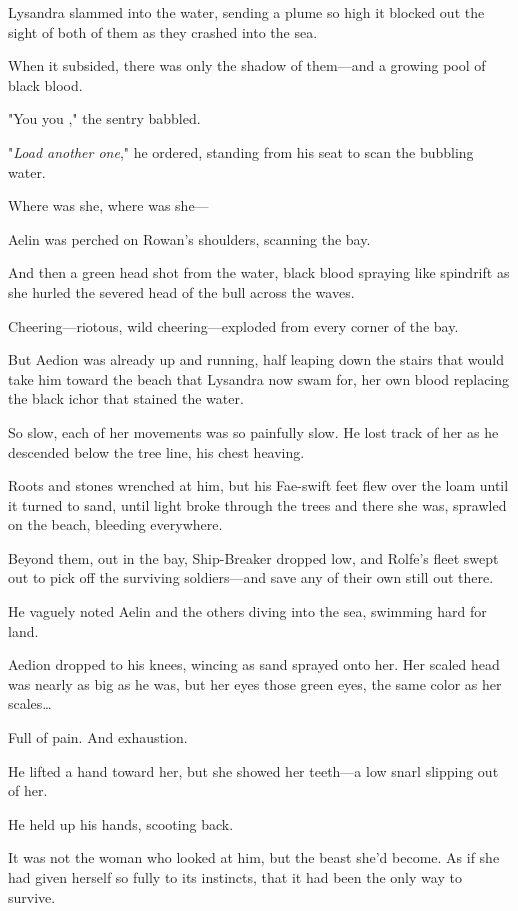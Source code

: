 Lysandra slammed into the water, sending a plume so high it blocked out the sight of both of them as they crashed into the sea.

When it subsided, there was only the shadow of them---and a growing pool of black blood.

"You  you  ," the sentry babbled.

"\emph{Load another one}," he ordered, standing from his seat to scan the bubbling water.

Where was she, where was she---

Aelin was perched on Rowan's shoulders, scanning the bay.

And then a green head shot from the water, black blood spraying like spindrift as she hurled the severed head of the bull across the waves.

Cheering---riotous, wild cheering---exploded from every corner of the bay.

But Aedion was already up and running, half leaping down the stairs that would take him toward the beach that Lysandra now swam for, her own blood replacing the black ichor that stained the water.

So slow, each of her movements was so painfully slow. He lost track of her as he descended below the tree line, his chest heaving.

Roots and stones wrenched at him, but his Fae-swift feet flew over the loam until it turned to sand, until light broke through the trees and there she was, sprawled on the beach, bleeding everywhere.

Beyond them, out in the bay, Ship-Breaker dropped low, and Rolfe's fleet swept out to pick off the surviving soldiers---and save any of their own still out there.

He vaguely noted Aelin and the others diving into the sea, swimming hard for land.

Aedion dropped to his knees, wincing as sand sprayed onto her. Her scaled head was nearly as big as he was, but her eyes  those green eyes, the same color as her scales\ldots{}

Full of pain. And exhaustion.

He lifted a hand toward her, but she showed her teeth---a low snarl slipping out of her.

He held up his hands, scooting back.

It was not the woman who looked at him, but the beast she'd become. As if she had given herself so fully to its instincts, that it had been the only way to survive.

